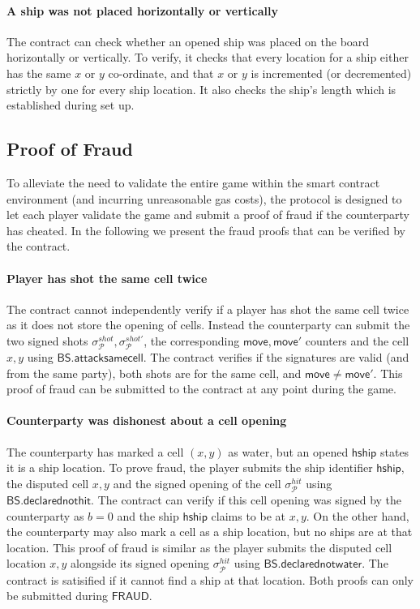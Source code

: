 \documentclass{llncs}
\newcommand{\gamefraud}{\mathsf{FRAUD}}
\newcommand{\hship}{\mathsf{hship}}
\newcommand{\participant}{\mathcal{P}}
\newcommand{\battleshipdeclarednothit}{\mathsf{BS.declarednothit}}
\newcommand{\battleshipdeclarednotwater}{\mathsf{BS.declarednotwater}}
\newcommand{\battleshipsamecell}{\mathsf{BS.attacksamecell}}
\begin{document}
\paragraph{A ship was not placed  horizontally or vertically}\label{sec:vertical}
The contract can check whether an opened ship was placed on the board horizontally or vertically. 
To verify, it checks that every location for a ship either has the same $x$ or $y$ co-ordinate, and that $x$ or $y$ is incremented (or decremented) strictly by one for every ship location. 
It also checks the ship's length which is established during set up. 

\subsection{Proof of Fraud}  \label{sec:prooffraud}

To alleviate the need to validate the entire game within the smart contract environment (and incurring unreasonable gas costs), the protocol is designed to let each player validate the game and submit a proof of fraud if the counterparty has cheated. 
In the following we present the fraud proofs that can be verified by the contract. 

\paragraph{Player has shot the same cell twice} 
The contract cannot independently verify if a player has shot the same cell twice as it does not store the opening of cells.
Instead the counterparty can submit the two signed shots $\sigma^{shot}_{\participant},\sigma^{shot'}_{\participant}$, the corresponding $\mathsf{move},\mathsf{move}'$ counters and the cell $x,y$ using $\battleshipsamecell$. 
The contract verifies if the signatures are valid (and from the same party), both shots are for the same cell, and $\mathsf{move}\neq\mathsf{move}'$. 
This proof of fraud can be submitted to the contract at any point during the game. 

\paragraph{Counterparty was dishonest about a cell opening}
The counterparty has marked a cell $(x,y)$ as water, but an opened $\hship$ states it is a ship location. 
To prove fraud, the player submits the ship identifier $\hship$, the disputed cell $x,y$ and the signed opening of the cell $\sigma^{hit}_{\participant}$ using $\battleshipdeclarednothit$.
The contract can verify if this cell opening was signed by the counterparty as $b = 0$ and the ship $\hship$ claims to be at $x,y$.   
On the other hand, the counterparty may also mark a cell as a ship location,  but no ships are at that location.
This proof of fraud is similar as the player submits the disputed cell location $x,y$ alongside its signed opening $\sigma^{hit}_{\participant}$ using $\battleshipdeclarednotwater$. 
The contract is satisified if it cannot find a ship at that location. 
Both proofs can only be submitted during $\gamefraud$. 
\end{document}
